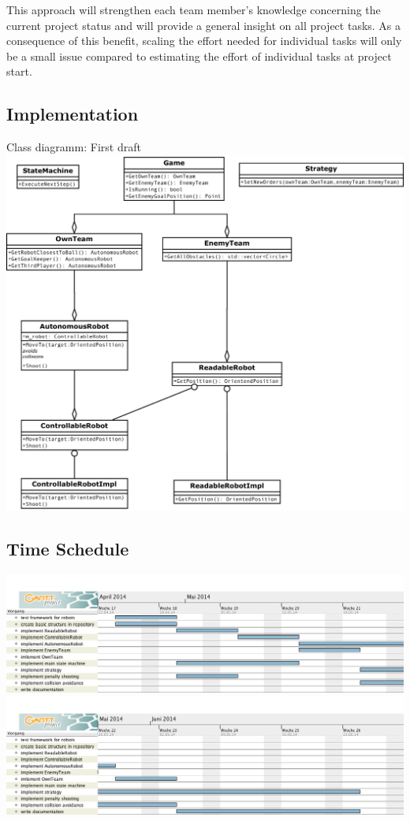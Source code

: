 \documentclass[12pt]{article}
\begin{document}
This approach will strengthen each team member's knowledge concerning the current project status and will provide a general insight on all project tasks. As a consequence of this benefit, scaling the effort needed for individual tasks will only be a small issue compared to estimating the effort of individual tasks at project start.

\subsection{Implementation}
Class diagramm: First draft\\
\includegraphics[width=\textwidth]{../architecture.pdf}
\subsection{Time Schedule}
\centering
\includegraphics[width = 1.3\textwidth , angle = 270]{../ganttchart1.png}
\includegraphics[width = 1.3\textwidth , angle = 270]{../ganttchart2.png}
\end{document}
